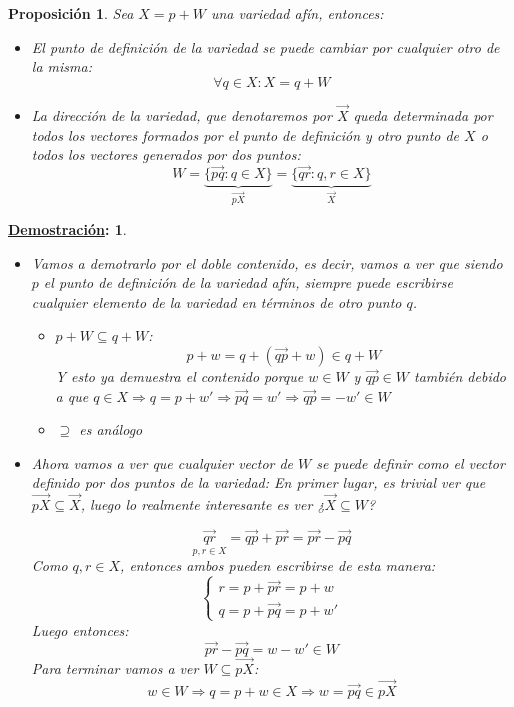 \documentclass[10pt,a4paper,openright]{book}
\theoremstyle{break}
\newtheorem*{prop}{Proposición}
\newtheorem*{demo}{\underline{Demostración}:}
\begin{document}
\begin{prop}
Sea $X=p+W$ una variedad afín, entonces:
\begin{itemize}
\item El punto de definición de la variedad se puede cambiar por cualquier otro de la misma:
$$\forall q \in X: X = q + W$$

\item La dirección de la variedad, que denotaremos por $\vec{X}$ queda determinada por todos los vectores formados por el punto de definición y otro punto de $X$ o todos los vectores generados por dos puntos:
$$W = \underbrace{\{ \vec{pq} : q \in X\}}_{\vec{pX}} = \underbrace{\{\vec{qr} : q,r \in X\}}_{\vec{X}}$$
\end{itemize}
\end{prop}
\begin{demo}
\begin{itemize}
\item Vamos a demotrarlo por el doble contenido, es decir, vamos a ver que siendo $p$ el punto de definición de la variedad afín, siempre puede escribirse cualquier elemento de la variedad en términos de otro punto $q$.
	\begin{itemize}
	\item $p+W \subseteq q+ W$:
$$p + w = q + (\vec{qp} + w) \in q + W $$
	Y esto ya demuestra el contenido porque $w\in W$ y $\vec{qp} \in W$ también debido a que $q \in X \Rightarrow q = p + w' \Rightarrow \vec{pq} = w' \Rightarrow \vec{qp} = -w' \in W$

	\item $\supseteq$ es análogo

	\end{itemize}


\item Ahora vamos a ver que cualquier vector de $W$ se puede definir como el vector definido por dos puntos de la variedad:
En primer lugar, es trivial ver que $\vec{pX} \subseteq \vec{X}$, luego lo realmente interesante es ver ¿$\vec{X} \subseteq W$?

$$\underset{p,r \in X}{\vec{qr}} = \vec{qp} + \vec{pr} = \vec{pr} - \vec{pq}$$
Como $q,r\in X$, entonces ambos pueden escribirse de esta manera:
$$\begin{cases} r = p + \vec{pr} = p+ w \\ q = p + \vec{pq} = p+w' \end{cases}$$
Luego entonces:
$$\vec{pr} - \vec{pq} = w-w'\in W$$
Para terminar vamos a ver $W \subseteq \vec{pX}$:
$$w \in W \Rightarrow q = p + w \in X \Rightarrow w = \vec{pq} \in \vec{pX}$$

\end{itemize}
\end{demo}
\end{document}
